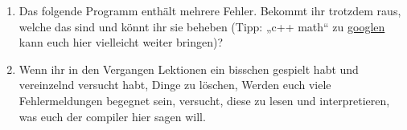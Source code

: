 \begin{spiel}
    \begin{enumerate}
        \item Das folgende Programm enthält mehrere Fehler. Bekommt ihr trotzdem
              raus, welche das sind und könnt ihr sie beheben (Tipp: „c++ math“ zu
              \href{http://lmgtfy.com/?q=c\%2B\%2B+math}{googlen} kann euch hier vielleicht weiter bringen)?
        \item Wenn ihr in den Vergangen Lektionen ein bisschen gespielt habt und
              vereinzelnd versucht habt, Dinge zu löschen, Werden euch viele
              Fehlermeldungen begegnet sein, versucht, diese zu lesen und
              interpretieren, was euch der compiler hier sagen will.
    \end{enumerate}

\end{spiel}
